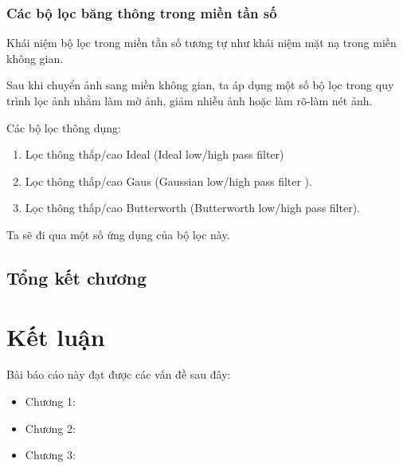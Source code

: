 \documentclass[12pt,a4paper]{report}
\numberwithin{equation}{section}
\theoremstyle{definition} %
\begin{document}
\subsection{Các bộ lọc băng thông trong miền tần số}

Khái niệm bộ lọc trong miền tần số tương tự như khái niệm mặt nạ trong miền không gian.

Sau khi chuyển ảnh sang miền không gian, ta áp dụng một số bộ lọc trong quy trình lọc ảnh nhằm làm mờ ảnh, giảm nhiễu ảnh hoặc làm rõ-làm nét ảnh.

Các bộ lọc thông dụng:
\begin{enumerate}
\item Lọc thông thấp/cao Ideal (Ideal low/high pass filter)
\item Lọc thông thấp/cao Gaus (Gaussian low/high pass filter
).

\item Lọc thông thấp/cao Butterworth (Butterworth low/high pass filter).



\end{enumerate}

Ta sẽ đi qua một số ứng dụng của bộ lọc này.

\section{Tổng kết chương}

	\chapter*{Kết luận}                         %
	\indent
	\thispagestyle{fancy}
	

Bài báo cáo này đạt được các vấn đề sau đây:
	
	\begin{itemize}
	\item Chương 1:
	

	
	\item Chương 2:

	
	\item Chương 3: 
	

	
	\end{itemize}
	
\end{document}

